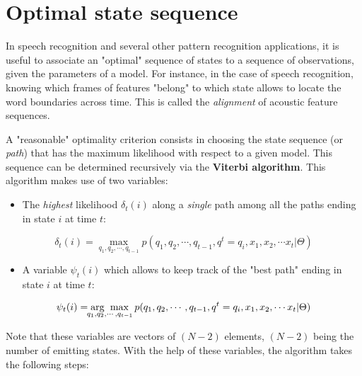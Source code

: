 \documentclass[11pt]{article}
\begin{document}
\section{Optimal state sequence}
\label{sec:org5eab432}
In speech recognition and several other pattern recognition
applications, it is useful to associate an "optimal" sequence of states
to a sequence of observations, given the parameters of a model. For
instance, in the case of speech recognition, knowing which frames of
features "belong" to which state allows to locate the word boundaries
across time. This is called the \emph{alignment} of acoustic feature
sequences.

A "reasonable" optimality criterion consists in choosing the state
sequence (or \emph{path}) that has the maximum likelihood with respect to a
given model. This sequence can be determined recursively via the
\textbf{Viterbi algorithm}. This algorithm makes use of two variables:

\begin{itemize}
\item The \emph{highest} likelihood \(\delta_t(i)\) along a \emph{single} path among
all the paths ending in state \(i\) at time \(t\):
\end{itemize}

$$
\delta_t(i) = \max_{q_1,q_2,\cdots,q_{t-1}}
p(q_1,q_2,\cdots,q_{t-1},q^t=q_i,x_1,x_2,\cdots x_t|\Theta)
$$

\begin{itemize}
\item A variable \(\psi_t(i)\) which allows to keep track of the "best path"
ending in state \(i\) at time \(t\):
\end{itemize}

$$
\psi_t(i) = \mbox{arg}\max_{\hspace{-4.5ex}q_1,q_2,\cdots,q_{t-1}}
p(q_1,q_2,\cdots,q_{t-1},q^t=q_i,x_1,x_2,\cdots x_t|\Theta)
$$

Note that these variables are vectors of \((N-2)\) elements, \((N-2)\) being
the number of emitting states. With the help of these variables, the
algorithm takes the following steps:
\end{document}
